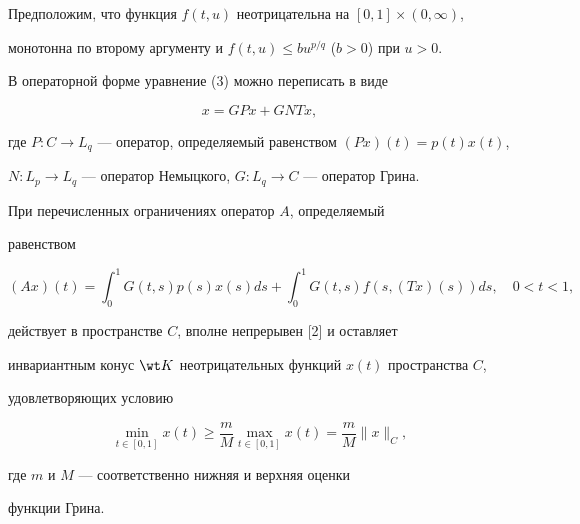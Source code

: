 Предположим, что функция $f(t,u)$ неотрицательна на $[0,1]\times(0,\infty)$, 


монотонна по второму аргументу и $f(t,u)\le bu^{p/q}$ ($b>0$) при $u>0$. 


 


В операторной форме уравнение (3) можно переписать в виде 


$$ 


x=GPx+GNTx, 


$$ 


где $P:C\to L_q$ --- оператор, определяемый равенством $(Px)(t)=p(t)x(t)$, 


$N:L_p\to L_q$ --- оператор Немыцкого, $G:L_q\to C$ --- оператор Грина. 


 


При перечисленных ограничениях оператор $A$, определяемый 


равенством 


\begin{equation} 


(Ax)(t)=\int^1_0G(t,s)p(s)x(s)ds+\int^1_0 


G(t,s)f(s,(Tx)(s))ds,\quad 0<t<1, 


\end{equation} 


действует в пространстве $C$, вполне непрерывен [2] и оставляет 


инвариантным конус $\wt K$ неотрицательных функций $x(t)$ пространства $C$, 


удовлетворяющих условию 


$$ 


\min_{t\in[0,1]}x(t)\ge \frac{m}{M}\max_{t\in[0,1]}x(t)= 


\frac{m}{M}\|x\|_C, 


$$ 


где $m$ и $M$ --- соответственно нижняя и верхняя оценки 


функции Грина. 


 


